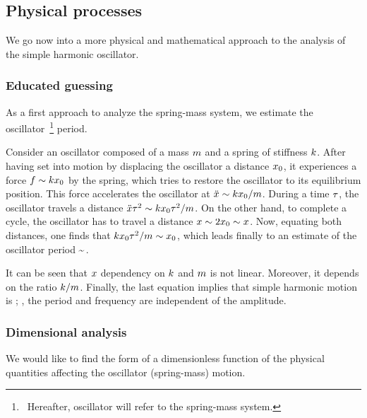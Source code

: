 \subsection{Physical processes}
We go now into a more physical and mathematical approach to the analysis of the simple harmonic oscillator.


\subsubsection{Educated guessing}\label{subsubsec:guessingsimpleoscillator}
As a first approach to analyze the spring-mass system, we estimate the oscillator~\footnote{~Hereafter, oscillator will refer to the spring-mass system.} period.

Consider an oscillator composed of a mass $m$ and a spring of stiffness $k$. After having set into motion by displacing the oscillator a distance $x_0$, it experiences a force $f\sim kx_0$ by the spring, which tries to restore the oscillator to its equilibrium position. This force accelerates the oscillator at $\ddot{x}\sim kx_0/m$. During a time $\tau$, the oscillator travels a distance $\ddot{x}\tau^2\sim kx_0\tau^2/m$. On the other hand, to complete a cycle, the oscillator has to travel a distance $x\sim 2x_0\sim x$. Now, equating both distances, one finds that $kx_0\tau^2/m\sim x_0$, which leads finally to an estimate of the oscillator period
\beq
\oper\sim\sqrt{\dfrac{\mass}{\kspring}}\,.
\eeq

It can be seen that $x$ dependency on $k$ and $m$ is not linear. Moreover, it depends on the ratio $k/m$. Finally, the last equation implies that simple harmonic motion is ; \ie, the period and frequency are independent of the amplitude.


\subsubsection{Dimensional analysis}
We would like to find the form of a dimensionless function of the physical quantities affecting the oscillator (spring-mass) motion.


